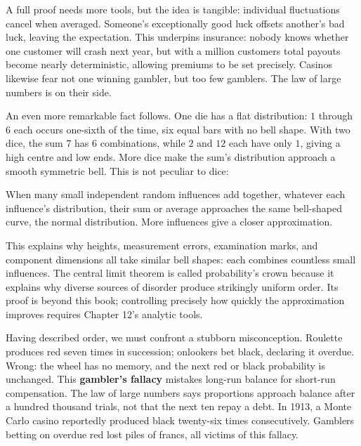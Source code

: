 A full proof needs more tools, but the idea is tangible: individual fluctuations cancel when averaged. Someone's exceptionally good luck offsets another's bad luck, leaving the expectation. This underpins insurance: nobody knows whether one customer will crash next year, but with a million customers total payouts become nearly deterministic, allowing premiums to be set precisely. Casinos likewise fear not one winning gambler, but too few gamblers. The law of large numbers is on their side.

An even more remarkable fact follows. One die has a flat distribution: $1$ through $6$ each occurs one-sixth of the time, six equal bars with no bell shape. With two dice, the sum $7$ has $6$ combinations, while $2$ and $12$ each have only $1$, giving a high centre and low ends. More dice make the sum's distribution approach a smooth symmetric bell. This is not peculiar to dice:

\begin{dingli}
When many small independent random influences add together, whatever each influence's distribution, their sum or average approaches the same bell-shaped curve, the normal distribution. More influences give a closer approximation.
\end{dingli}

\begin{center}
\end{center}

This explains why heights, measurement errors, examination marks, and component dimensions all take similar bell shapes: each combines countless small influences. The central limit theorem is called probability's crown because it explains why diverse sources of disorder produce strikingly uniform order. Its proof is beyond this book; controlling precisely how quickly the approximation improves requires Chapter 12's analytic tools.

Having described order, we must confront a stubborn misconception. Roulette produces red seven times in succession; onlookers bet black, declaring it overdue. Wrong: the wheel has no memory, and the next red or black probability is unchanged. This \textbf{gambler's fallacy} mistakes long-run balance for short-run compensation. The law of large numbers says proportions approach balance after a hundred thousand trials, not that the next ten repay a debt. In 1913, a Monte Carlo casino reportedly produced black twenty-six times consecutively. Gamblers betting on overdue red lost piles of francs, all victims of this fallacy.

